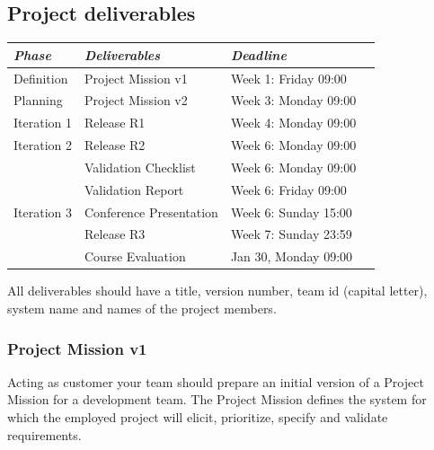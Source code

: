 \documentclass[10pt,a4paper]{article}
\begin{document}
\subsection{Project deliverables}
\begin{tabular}{l |l p{5cm}  l}
{\it Phase} & {\it Deliverables} & {\it Deadline} \\
\hline
Definition & Project Mission v1& Week 1: Friday 09:00\\
Planning & Project Mission v2& Week 3: Monday 09:00\\
Iteration 1 & Release R1 & Week 4: Monday 09:00 \\
Iteration 2 & Release R2  & Week 6: Monday 09:00\\
   & Validation Checklist & Week 6: Monday 09:00\\
   & Validation Report & Week 6: Friday 09:00\\
Iteration 3 & Conference Presentation & Week 6: Sunday 15:00\\
   & Release R3 & Week 7: Sunday 23:59\\
   & Course Evaluation & Jan 30, Monday 09:00  \\

\end{tabular}
\vskip3mm

\noindent All deliverables should have a title, version number, team id (capital letter), system name and names of the project members. 

\subsubsection{Project Mission v1}

Acting as customer your team should prepare an initial version of a Project Mission for a development team. The Project Mission defines the system for which the employed project will elicit, prioritize, specify and validate requirements.
\end{document}
